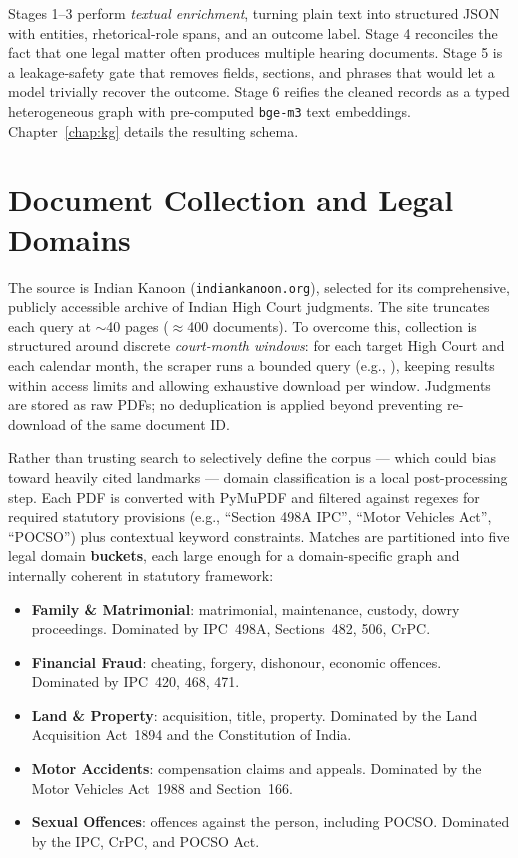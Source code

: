 Stages 1--3 perform \emph{textual enrichment}, turning plain text into structured JSON with entities, rhetorical-role spans, and an outcome label. Stage 4 reconciles the fact that one legal matter often produces multiple hearing documents. Stage 5 is a leakage-safety gate that removes fields, sections, and phrases that would let a model trivially recover the outcome. Stage 6 reifies the cleaned records as a typed heterogeneous graph with pre-computed \texttt{bge-m3} text embeddings. Chapter~\ref{chap:kg} details the resulting schema.

\section{Document Collection and Legal Domains}

\begin{sloppypar}
The source is Indian Kanoon (\texttt{indiankanoon.org}), selected for its comprehensive, publicly accessible archive of Indian High Court judgments. The site truncates each query at $\sim$40 pages ($\approx$400 documents). To overcome this, collection is structured around discrete \emph{court-month windows}: for each target High Court and each calendar month, the scraper runs a bounded query (e.g., ), keeping results within access limits and allowing exhaustive download per window. Judgments are stored as raw PDFs; no deduplication is applied beyond preventing re-download of the same document ID.
\end{sloppypar}

Rather than trusting search to selectively define the corpus --- which could bias toward heavily cited landmarks --- domain classification is a local post-processing step. Each PDF is converted with PyMuPDF and filtered against regexes for required statutory provisions (e.g., ``Section 498A IPC'', ``Motor Vehicles Act'', ``POCSO'') plus contextual keyword constraints. Matches are partitioned into five legal domain \textbf{buckets}, each large enough for a domain-specific graph and internally coherent in statutory framework:

\begin{itemize}
  \item \textbf{Family \& Matrimonial}: matrimonial, maintenance, custody, dowry proceedings. Dominated by IPC~498A, Sections~482, 506, CrPC.
  \item \textbf{Financial Fraud}: cheating, forgery, dishonour, economic offences. Dominated by IPC~420, 468, 471.
  \item \textbf{Land \& Property}: acquisition, title, property. Dominated by the Land Acquisition Act~1894 and the Constitution of India.
  \item \textbf{Motor Accidents}: compensation claims and appeals. Dominated by the Motor Vehicles Act~1988 and Section~166.
  \item \textbf{Sexual Offences}: offences against the person, including POCSO. Dominated by the IPC, CrPC, and POCSO Act.
\end{itemize}

